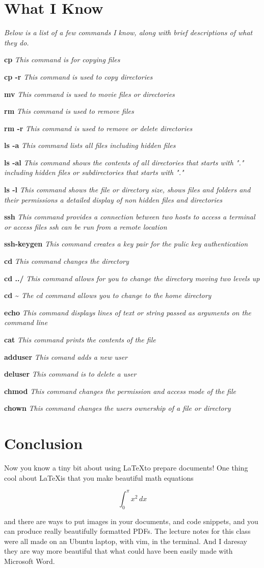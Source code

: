 \documentclass[11pt]{article}
\newcommand{\iknow}[2]{\par\textbf{#1} \textit{#2}}
\begin{document}
\section*{What I Know}

\noindent\textit{Below is a list of a few commands I know, along with brief descriptions of what they do.}
\iknow{cp}{This command is for copying files}
\iknow{cp -r}{This command is used to copy directories}
\iknow{mv}{This command is used to movie files or directories}
\iknow{rm}{This command is used to remove files}
\iknow{rm -r}{This command is used to remove or delete directories}
\iknow{ls -a}{This command lists all files including hidden files}
\iknow{ls -al}{This command shows the contents of all directories that starts with "." including hidden files or subdirectories that starts with "."}
\iknow{ls -l}{This command shows the file or directory size, shows files and folders and their permissions a detailed display of non hidden files and directories}
\iknow{ssh}{This command provides a connection between two hosts to access a terminal or access files ssh can be run from a remote location}
\iknow{ssh-keygen}{This command creates a key pair for the pulic key authentication }
\iknow{cd}{This command changes the directory}
\iknow{cd ../}{This command allows for you to change the directory moving two levels up}
\iknow{cd \textasciitilde}{The cd command allows you to change to the home directory}
\iknow{echo}{This command displays lines of text or string passed as arguments on the command line}
\iknow{cat}{This command prints the contents of the file}
\iknow{adduser}{This comand adds a new user}
\iknow{deluser}{This command is to delete a user}
\iknow{chmod}{This command changes the permission and access mode of the file}
\iknow{chown}{This command changes the users ownership of a file or directory}

\section*{Conclusion}
Now you know a tiny bit about using \LaTeX to prepare documents! One thing cool about \LaTeX is that you make beautiful math equations

\begin{equation}
\int_{0}^{\pi}x^2\,dx
\end{equation}

and there are ways to put images in your documents, and code snippets, and you can produce really beautifully formatted PDFs. The lecture notes for this class were all made on an Ubuntu laptop, with vim, in the terminal. And I daresay they are way more beautiful that what could have been easily made with Microsoft Word.
\end{document}
